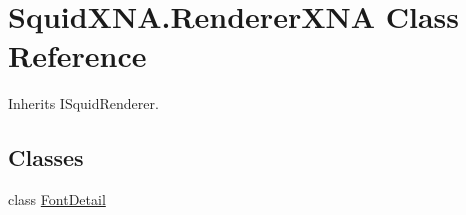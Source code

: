 \hypertarget{class_squid_x_n_a_1_1_renderer_x_n_a}{\section{Squid\+X\+N\+A.\+Renderer\+X\+N\+A Class Reference}
\label{class_squid_x_n_a_1_1_renderer_x_n_a}
}


Inherits I\+Squid\+Renderer.

\subsection*{Classes}
\begin{DoxyCompactItemize}
\item 
class \hyperlink{class_squid_x_n_a_1_1_renderer_x_n_a_1_1_font_detail}{Font\+Detail}
\end{DoxyCompactItemize}
